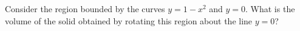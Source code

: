 Consider the region bounded by the curves $y = 1-x^2$ and $y =0$. What is the volume of the solid obtained by
rotating this region about the line $y = 0$?

